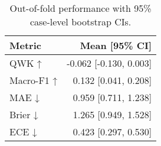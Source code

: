 \begin{table}
\caption{Out-of-fold performance with 95\% case-level bootstrap CIs.}
\label{tab:oof-performance}
\begin{tabular}{lr}
\toprule
Metric & Mean [95\% CI] \\
\midrule
QWK ↑ & -0.062 [-0.130, 0.003] \\
Macro-F1 ↑ & 0.132 [0.041, 0.208] \\
MAE ↓ & 0.959 [0.711, 1.238] \\
Brier ↓ & 1.265 [0.949, 1.528] \\
ECE ↓ & 0.423 [0.297, 0.530] \\
\bottomrule
\end{tabular}
\end{table}
